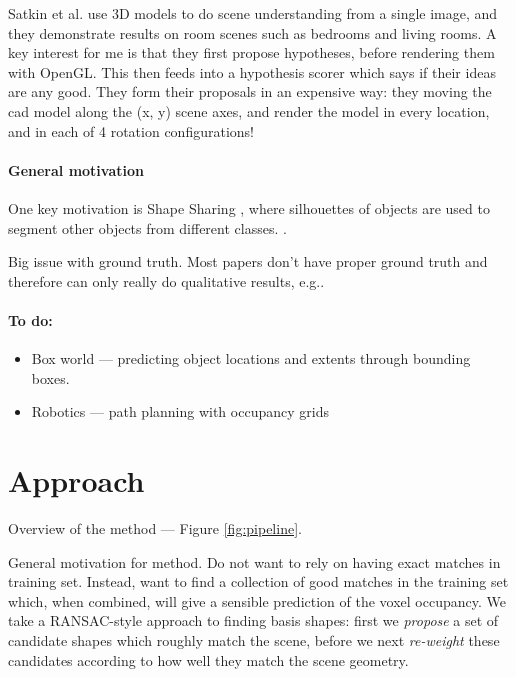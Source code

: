 \documentclass[10pt,a4paper, twocolumn]{article}
\makeatletter
\newcommand*{\eg}{e.g.\@\xspace}
\newcommand*{\ea}{et al.\@\xspace}
\makeatother
\begin{document}
Satkin \ea \cite{satkin-bmvc-2012} use 3D models to do scene understanding from a single image, and they demonstrate results on room scenes such as bedrooms and living rooms. 
A key interest for me is that they first propose hypotheses, before rendering them with OpenGL.
This then feeds into a hypothesis scorer which says if their ideas are any good. 
They form their proposals in an expensive way: they moving the cad model along the (x, y) scene axes, and render the model in every location, and in each of 4 rotation configurations!


\paragraph{General motivation}
One key motivation is Shape Sharing \cite{kim-eccv-2012}, where silhouettes of objects are used to segment other objects from different classes.
 \cite{nan-acm-2012}.

Big issue with ground truth. Most papers don't have proper ground truth and therefore can only really do qualitative results, \eg \cite{all the papers...}.

\paragraph{To do:}
\begin{itemize}
\item Box world --- predicting object locations and extents through bounding boxes.
\item Robotics --- path planning with occupancy grids
\end{itemize}


\section{Approach}

Overview of the method --- Figure \ref{fig:pipeline}.


General motivation for method. Do not want to rely on having exact matches in training set. 
Instead, want to find a collection of good matches in the training set which, when combined, will give a sensible prediction of the voxel occupancy.
We take a RANSAC-style approach to finding basis shapes: first we \emph{propose} a set of candidate shapes which roughly match the scene, before we next \emph{re-weight} these candidates according to how well they match the scene geometry. 
\end{document}
